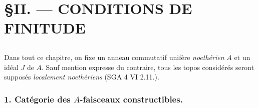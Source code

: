 









\chapter*{\S \space II. --- CONDITIONS DE FINITUDE}\thispagestyle{empty}
\label{ch:2}
\section*{}

Dans tout ce chapitre, on fixe un anneau commutatif unifère \emph{noethérien} $A$ et un idéal $J$ de $A$. Sauf mention expresse du contraire, tous les topos considérés seront supposés \emph{localement noethériens} (SGA 4 VI 2.11.).

\subsection*{1. Catégorie des $A$-faisceaux constructibles.}

